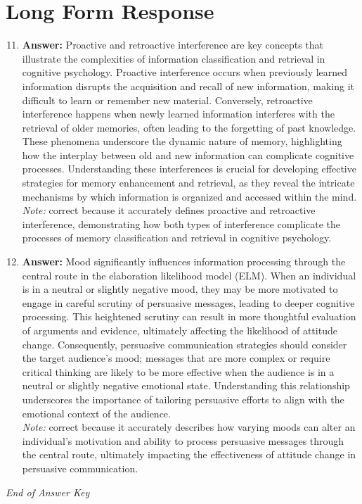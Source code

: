 \documentclass[12pt]{article}
\begin{document}
\section*{Long Form Response}
\begin{enumerate}[label=\arabic*.]
\setcounter{enumi}{10}
\item \textbf{Answer:} Proactive and retroactive interference are key concepts that illustrate the complexities of information classification and retrieval in cognitive psychology. Proactive interference occurs when previously learned information disrupts the acquisition and recall of new information, making it difficult to learn or remember new material. Conversely, retroactive interference happens when newly learned information interferes with the retrieval of older memories, often leading to the forgetting of past knowledge. These phenomena underscore the dynamic nature of memory, highlighting how the interplay between old and new information can complicate cognitive processes. Understanding these interferences is crucial for developing effective strategies for memory enhancement and retrieval, as they reveal the intricate mechanisms by which information is organized and accessed within the mind.
\\ \textit{Note:} correct because it accurately defines proactive and retroactive interference, demonstrating how both types of interference complicate the processes of memory classification and retrieval in cognitive psychology.
\item \textbf{Answer:} Mood significantly influences information processing through the central route in the elaboration likelihood model (ELM). When an individual is in a neutral or slightly negative mood, they may be more motivated to engage in careful scrutiny of persuasive messages, leading to deeper cognitive processing. This heightened scrutiny can result in more thoughtful evaluation of arguments and evidence, ultimately affecting the likelihood of attitude change. Consequently, persuasive communication strategies should consider the target audience's mood; messages that are more complex or require critical thinking are likely to be more effective when the audience is in a neutral or slightly negative emotional state. Understanding this relationship underscores the importance of tailoring persuasive efforts to align with the emotional context of the audience.
\\ \textit{Note:} correct because it accurately describes how varying moods can alter an individual's motivation and ability to process persuasive messages through the central route, ultimately impacting the effectiveness of attitude change in persuasive communication.
\end{enumerate}

\vfill
\noindent\textit{End of Answer Key}
\end{document}
